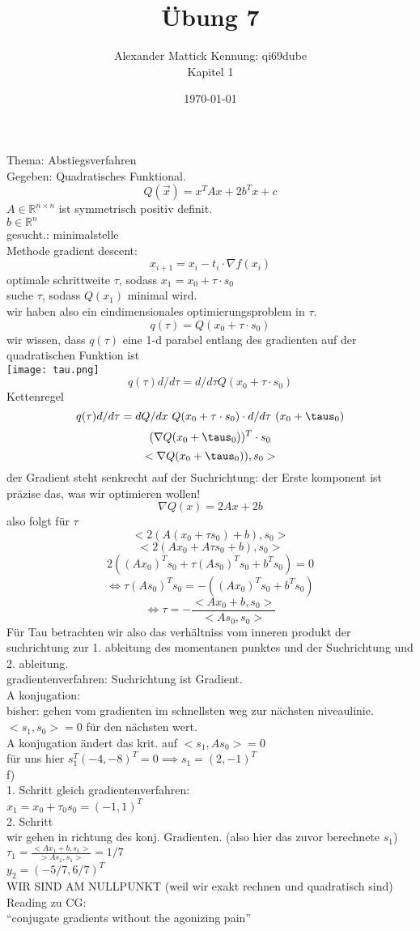\documentclass{article}
\author{
Alexander Mattick Kennung: qi69dube\\
Kapitel 1
}
\date{\today}
\title{Übung 7}
\begin{document}
	Thema: Abstiegsverfahren\\
  Gegeben: Quadratisches Funktional.\\
  \[Q(\vec{x}) = x^TAx +2b^Tx+c\]
  $A\in\mathbb{R}^{n\times n}$ ist symmetrisch positiv definit.\\
  $b\in\mathbb{R}^n$\\
  gesucht.: minimalstelle\\
  Methode gradient descent:\\
  \[x_{i+1} =  x_i - t_i\cdot \nabla f(x_i)\]
  optimale schrittweite $\tau$, sodass
  $x_1 = x_0 +\tau\cdot s_0$\\
  suche $\tau$, sodass $Q(x_1)$ minimal wird.\\
  wir haben also ein eindimensionales optimierungsproblem in $\tau$.
  \[q(\tau) = Q(x_0+\tau\cdot s_0)\]
  wir wissen, dass $q(\tau)$ eine 1-d parabel entlang des gradienten auf der quadratischen Funktion ist\\
  \texttt{[image: tau.png]}\\
  \[q(\tau)d/d\tau = d/d\tau Q(x_0+\tau\cdot s_0)\]
  Kettenregel
  \[q(\tau)d/d\tau = dQ/dx\ Q(x_0+\tau\cdot s_0) \cdot d/d\tau\ (x_0+\taus_0)\]
  \[(\nabla Q(x_0+\taus_0))^T\cdot s_0\]
  \[<\nabla Q(x_0+\taus_0)), s_0>\]
  der Gradient steht senkrecht auf der Suchrichtung: der Erste komponent ist präzise das, was wir optimieren wollen!\\
  \[\nabla Q(x) = 2Ax+2b\]
  also folgt für $\tau$
  \[<2(A(x_0+\tau s_0)+b), s_0>\]
  \[<2(Ax_0+A\tau s_0+b), s_0>\]
  \[2((Ax_0)^T s_0 + \tau(As_0)^T s_0 +b^T s_0)=0\]
  \[\iff \tau (As_0)^Ts_0 = -((Ax_0)^T s_0+b^T s_0)\]
  \[\iff \tau  = -\frac{<Ax_0+b,s_0>}{<As_0,s_0>}\]
  Für Tau betrachten wir also das  verhältniss vom inneren produkt der suchrichtung zur 1. ableitung des momentanen punktes und der Suchrichtung und 2. ableitung.\\
  gradientenverfahren: Suchrichtung ist Gradient.\\
  A konjugation:\\
  bisher: gehen vom gradienten im schnellsten weg zur nächsten niveaulinie. $<s_1,s_0>=0$ für den nächsten wert.\\
  A konjugation ändert das krit. auf $<s_1,As_0>=0$ \\
  für uns hier $s_1^T (-4,-8)^T=0\implies s_1= (2,-1)^T$\\
  f)\\
  1. Schritt gleich gradientenverfahren:\\
  $x_1 = x_0+\tau_0 s_0 = (-1,1)^T$\\
  2. Schritt\\
  wir gehen in richtung des konj. Gradienten. (also hier das zuvor berechnete $s_1$)\\
  $\tau_1 = \frac{<Ax_1+b,s_1>}{>As_1,s_1>} = 1/7$\\
  $y_2 = (-5/7, 6/7)^T$\\
  WIR SIND AM NULLPUNKT (weil wir exakt rechnen und quadratisch sind)\\
  Reading zu CG:\\
  ``conjugate gradients without the agonizing pain''\\
\end{document}
